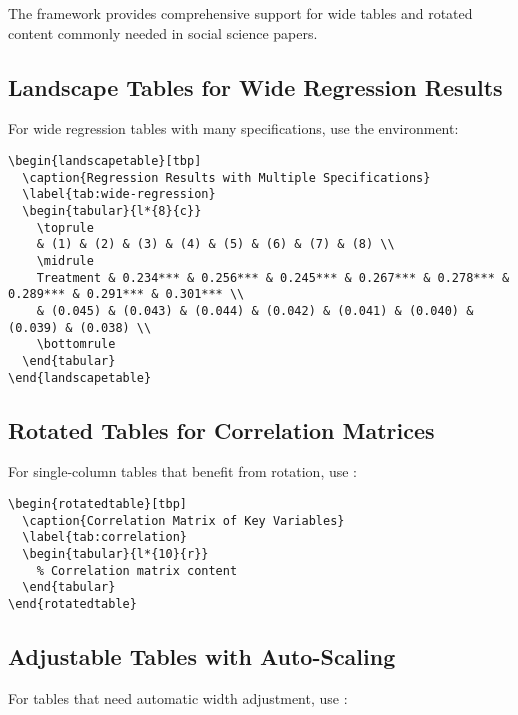 \documentclass[11pt]{article}
\begin{document}
The framework provides comprehensive support for wide tables and rotated content commonly needed in social science papers.

\subsection{Landscape Tables for Wide Regression Results}

For wide regression tables with many specifications, use the  environment:

\begin{verbatim}
\begin{landscapetable}[tbp]
  \caption{Regression Results with Multiple Specifications}
  \label{tab:wide-regression}
  \begin{tabular}{l*{8}{c}}
    \toprule
    & (1) & (2) & (3) & (4) & (5) & (6) & (7) & (8) \\
    \midrule
    Treatment & 0.234*** & 0.256*** & 0.245*** & 0.267*** & 0.278*** & 0.289*** & 0.291*** & 0.301*** \\
    & (0.045) & (0.043) & (0.044) & (0.042) & (0.041) & (0.040) & (0.039) & (0.038) \\
    \bottomrule
  \end{tabular}
\end{landscapetable}
\end{verbatim}

\subsection{Rotated Tables for Correlation Matrices}

For single-column tables that benefit from rotation, use :

\begin{verbatim}
\begin{rotatedtable}[tbp]
  \caption{Correlation Matrix of Key Variables}
  \label{tab:correlation}
  \begin{tabular}{l*{10}{r}}
    % Correlation matrix content
  \end{tabular}
\end{rotatedtable}
\end{verbatim}

\subsection{Adjustable Tables with Auto-Scaling}

For tables that need automatic width adjustment, use :
\end{document}

